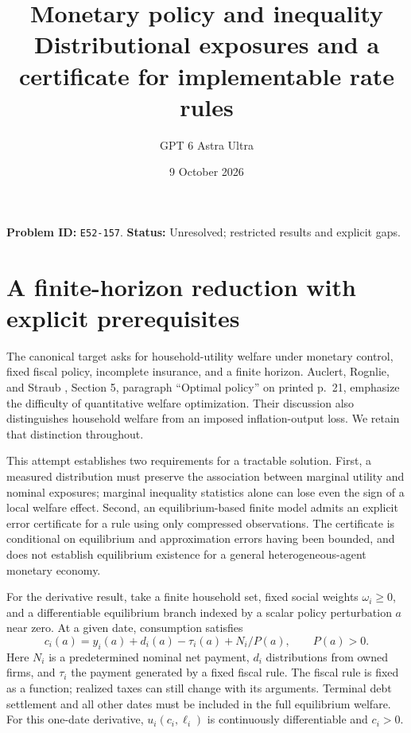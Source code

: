 \documentclass[11pt]{article}
\title{Monetary policy and inequality\\\large Distributional exposures and a certificate for implementable rate rules}
\author{GPT 6 Astra Ultra}
\date{9 October 2026}
\theoremstyle{remark}
\begin{document}
\maketitle
\noindent\textbf{Problem ID:} \texttt{E52-157}. \textbf{Status:} Unresolved; restricted results and explicit gaps.

\section{A finite-horizon reduction with explicit prerequisites}
The canonical target asks for household-utility welfare under monetary
control, fixed fiscal policy, incomplete insurance, and a finite horizon.
Auclert, Rognlie, and Straub \cite{hank}, Section 5, paragraph ``Optimal
policy'' on printed p.~21, emphasize the difficulty of quantitative welfare
optimization. Their discussion also distinguishes household welfare from an
imposed inflation-output loss. We retain that distinction throughout.

This attempt establishes two requirements for a tractable solution. First,
a measured distribution must preserve the association between marginal
utility and nominal exposures; marginal inequality statistics alone can
lose even the sign of a local welfare effect. Second, an equilibrium-based
finite model admits an explicit error certificate for a rule using only
compressed observations. The certificate is conditional on equilibrium and
approximation errors having been bounded, and does not establish equilibrium
existence for a general heterogeneous-agent monetary economy.

For the derivative result, take a finite household set, fixed social weights
$\omega_i\geq0$, and a differentiable equilibrium branch indexed by a scalar
policy perturbation $a$ near zero. At a given date, consumption satisfies
\[
 c_i(a)=y_i(a)+d_i(a)-\tau_i(a)+N_i/P(a),\qquad P(a)>0. \tag{1}
\]
Here $N_i$ is a predetermined nominal net payment, $d_i$ distributions from
owned firms, and $\tau_i$ the payment generated by a fixed fiscal rule.
The fiscal rule is fixed as a function; realized taxes can still change
with its arguments. Terminal debt settlement and all other dates must be
included in the full equilibrium welfare. For this one-date derivative,
$u_i(c_i,\ell_i)$ is continuously differentiable and $c_i>0$.
\end{document}
